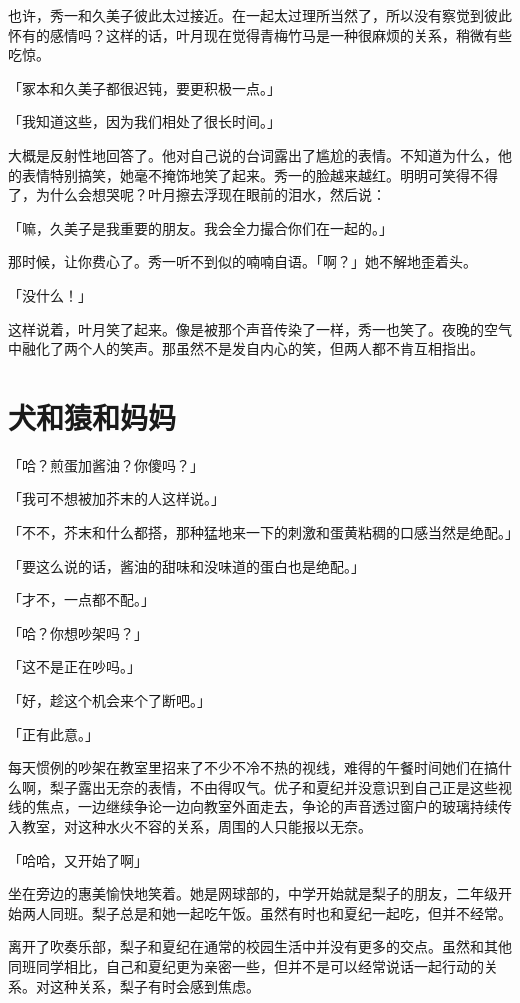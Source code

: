 \documentclass[UTF8]{ctexart}
\begin{document}
    也许，秀一和久美子彼此太过接近。在一起太过理所当然了，所以没有察觉到彼此怀有的感情吗？这样的话，叶月现在觉得青梅竹马是一种很麻烦的关系，稍微有些吃惊。

    「冢本和久美子都很迟钝，要更积极一点。」

    「我知道这些，因为我们相处了很长时间。」

    大概是反射性地回答了。他对自己说的台词露出了尴尬的表情。不知道为什么，他的表情特别搞笑，她毫不掩饰地笑了起来。秀一的脸越来越红。明明可笑得不得了，为什么会想哭呢？叶月擦去浮现在眼前的泪水，然后说：

    「嘛，久美子是我重要的朋友。我会全力撮合你们在一起的。」

    那时候，让你费心了。秀一听不到似的喃喃自语。「啊？」她不解地歪着头。

    「没什么！」

    这样说着，叶月笑了起来。像是被那个声音传染了一样，秀一也笑了。夜晚的空气中融化了两个人的笑声。那虽然不是发自内心的笑，但两人都不肯互相指出。
    \section{犬和猿和妈妈}
    「哈？煎蛋加酱油？你傻吗？」

    「我可不想被加芥末的人这样说。」

    「不不，芥末和什么都搭，那种猛地来一下的刺激和蛋黄粘稠的口感当然是绝配。」

    「要这么说的话，酱油的甜味和没味道的蛋白也是绝配。」

    「才不，一点都不配。」

    「哈？你想吵架吗？」

    「这不是正在吵吗。」

    「好，趁这个机会来个了断吧。」

    「正有此意。」

    每天惯例的吵架在教室里招来了不少不冷不热的视线，难得的午餐时间她们在搞什么啊，梨子露出无奈的表情，不由得叹气。优子和夏纪并没意识到自己正是这些视线的焦点，一边继续争论一边向教室外面走去，争论的声音透过窗户的玻璃持续传入教室，对这种水火不容的关系，周围的人只能报以无奈。

    「哈哈，又开始了啊」

    坐在旁边的惠美愉快地笑着。她是网球部的，中学开始就是梨子的朋友，二年级开始两人同班。梨子总是和她一起吃午饭。虽然有时也和夏纪一起吃，但并不经常。

    离开了吹奏乐部，梨子和夏纪在通常的校园生活中并没有更多的交点。虽然和其他同班同学相比，自己和夏纪更为亲密一些，但并不是可以经常说话一起行动的关系。对这种关系，梨子有时会感到焦虑。
\end{document}
